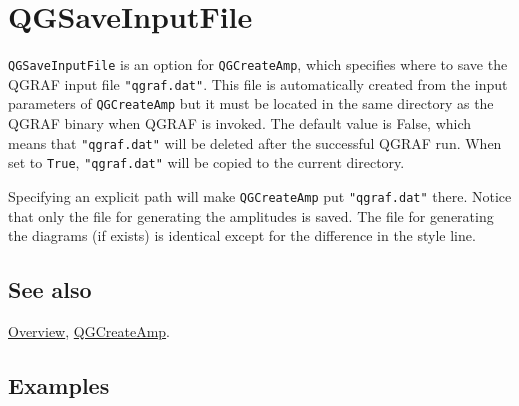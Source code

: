 \documentclass[../FeynHelpersManual.tex]{subfiles}
\begin{document}
\hypertarget{qgsaveinputfile}{
\section{QGSaveInputFile}\label{qgsaveinputfile}}

\texttt{QGSaveInputFile} is an option for \texttt{QGCreateAmp}, which
specifies where to save the QGRAF input file \texttt{"qgraf.dat"}. This
file is automatically created from the input parameters of
\texttt{QGCreateAmp} but it must be located in the same directory as the
QGRAF binary when QGRAF is invoked. The default value is False, which
means that \texttt{"qgraf.dat"} will be deleted after the successful
QGRAF run. When set to \texttt{True}, \texttt{"qgraf.dat"} will be
copied to the current directory.

Specifying an explicit path will make \texttt{QGCreateAmp} put
\texttt{"qgraf.dat"} there. Notice that only the file for generating the
amplitudes is saved. The file for generating the diagrams (if exists) is
identical except for the difference in the style line.

\subsection{See also}

\hyperlink{toc}{Overview}, \hyperlink{qgcreateamp}{QGCreateAmp}.

\subsection{Examples}
\end{document}
